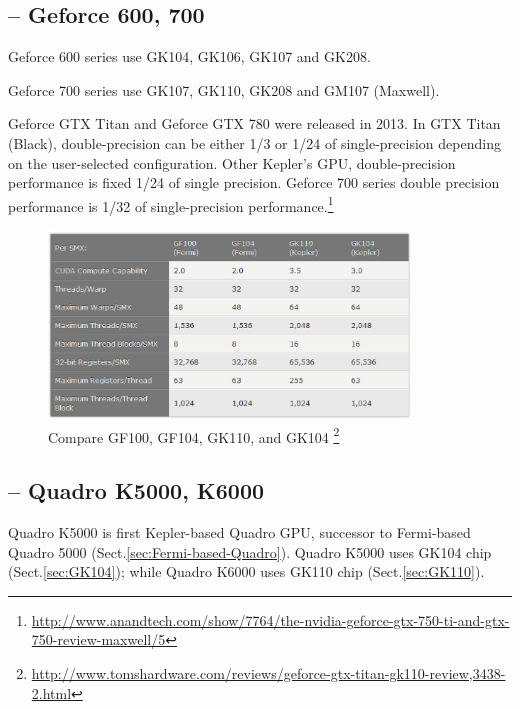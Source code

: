 \subsection{-- Geforce 600, 700}
\label{sec:Kepler-based-Geforce}

Geforce 600 series use GK104, GK106, GK107 and GK208.

Geforce 700 series use GK107, GK110, GK208 and GM107 (Maxwell). 

Geforce GTX Titan and Geforce GTX 780 were released in 2013. In GTX Titan
(Black), double-precision can be either 1/3 or 1/24 of single-precision
depending on the user-selected configuration. Other Kepler's GPU,
double-precision performance is fixed 1/24 of single precision. Geforce 700
series double precision performance is 1/32 of single-precision
performance.\footnote{\url{http://www.anandtech.com/show/7764/the-nvidia-geforce-gtx-750-ti-and-gtx-750-review-maxwell/5}}

\begin{figure}[hbt]
  \centerline{\includegraphics[height=5cm,
    angle=0]{./images/compare_CUDA-capable-GPUchips.eps}}
\caption{Compare GF100, GF104, GK110, and GK104
\footnote{\url{http://www.tomshardware.com/reviews/geforce-gtx-titan-gk110-review,3438-2.html}}}
\label{fig:compare_CUDA-capable-GPUchips}
\end{figure}

\subsection{-- Quadro K5000, K6000}
\label{sec:Kepler-based-Quadro}

Quadro K5000 is first Kepler-based Quadro GPU, successor to Fermi-based Quadro
5000 (Sect.\ref{sec:Fermi-based-Quadro}). Quadro K5000 uses GK104 chip
(Sect.\ref{sec:GK104}); while Quadro K6000 uses GK110 chip
(Sect.\ref{sec:GK110}).

